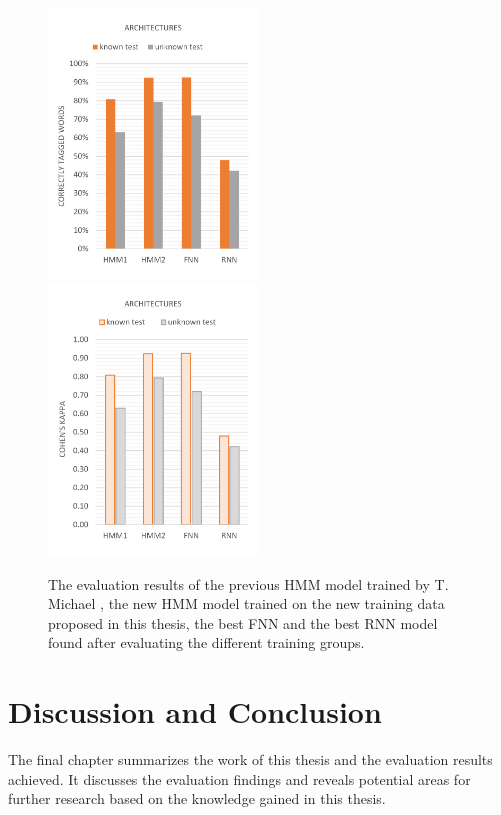 \begin{figure}[H]
\centering
{}
{\includegraphics[width=0.495\textwidth]{images/comparison}}
{\includegraphics[width=0.495\textwidth]{images/comparison_k}}
\vspace{1em}
\caption[Comparison of all Architectures]{The evaluation results of the previous HMM model trained by T. Michael \cite{michael2016}, the new HMM model trained on the new training data proposed in this thesis, the best FNN and the best RNN model found after evaluating the different training groups.}
\label{f.evaluation.comparison}
\end{figure}

\chapter{Discussion and Conclusion}\label{c.conclusion}
The final chapter summarizes the work of this thesis and the evaluation results achieved. It discusses the evaluation findings and reveals potential areas for further research based on the knowledge gained in this thesis.


